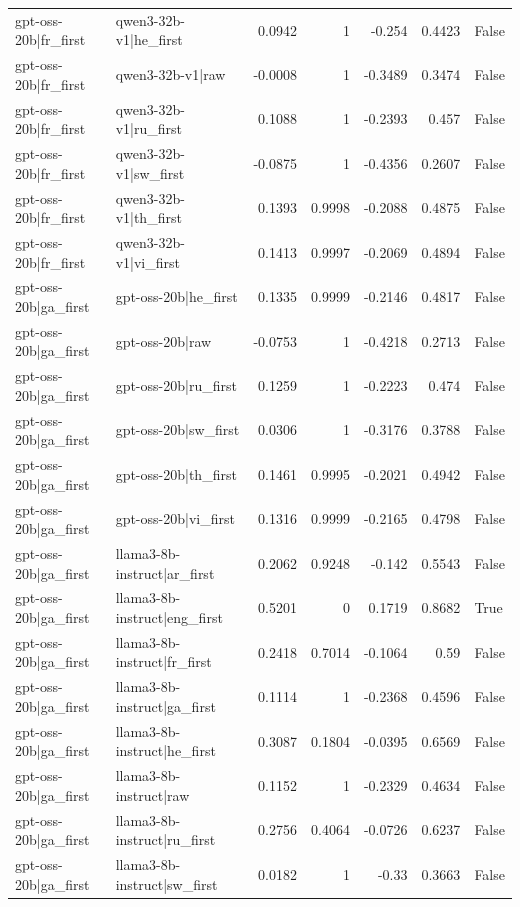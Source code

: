 \begin{table}
\begin{tabular}{l l r r r r l}
gpt-oss-20b|fr_first & qwen3-32b-v1|he_first & 0.0942 & 1 & -0.254 & 0.4423 & False \\
gpt-oss-20b|fr_first & qwen3-32b-v1|raw & -0.0008 & 1 & -0.3489 & 0.3474 & False \\
gpt-oss-20b|fr_first & qwen3-32b-v1|ru_first & 0.1088 & 1 & -0.2393 & 0.457 & False \\
gpt-oss-20b|fr_first & qwen3-32b-v1|sw_first & -0.0875 & 1 & -0.4356 & 0.2607 & False \\
gpt-oss-20b|fr_first & qwen3-32b-v1|th_first & 0.1393 & 0.9998 & -0.2088 & 0.4875 & False \\
gpt-oss-20b|fr_first & qwen3-32b-v1|vi_first & 0.1413 & 0.9997 & -0.2069 & 0.4894 & False \\
gpt-oss-20b|ga_first & gpt-oss-20b|he_first & 0.1335 & 0.9999 & -0.2146 & 0.4817 & False \\
gpt-oss-20b|ga_first & gpt-oss-20b|raw & -0.0753 & 1 & -0.4218 & 0.2713 & False \\
gpt-oss-20b|ga_first & gpt-oss-20b|ru_first & 0.1259 & 1 & -0.2223 & 0.474 & False \\
gpt-oss-20b|ga_first & gpt-oss-20b|sw_first & 0.0306 & 1 & -0.3176 & 0.3788 & False \\
gpt-oss-20b|ga_first & gpt-oss-20b|th_first & 0.1461 & 0.9995 & -0.2021 & 0.4942 & False \\
gpt-oss-20b|ga_first & gpt-oss-20b|vi_first & 0.1316 & 0.9999 & -0.2165 & 0.4798 & False \\
gpt-oss-20b|ga_first & llama3-8b-instruct|ar_first & 0.2062 & 0.9248 & -0.142 & 0.5543 & False \\
gpt-oss-20b|ga_first & llama3-8b-instruct|eng_first & 0.5201 & 0 & 0.1719 & 0.8682 & True \\
gpt-oss-20b|ga_first & llama3-8b-instruct|fr_first & 0.2418 & 0.7014 & -0.1064 & 0.59 & False \\
gpt-oss-20b|ga_first & llama3-8b-instruct|ga_first & 0.1114 & 1 & -0.2368 & 0.4596 & False \\
gpt-oss-20b|ga_first & llama3-8b-instruct|he_first & 0.3087 & 0.1804 & -0.0395 & 0.6569 & False \\
gpt-oss-20b|ga_first & llama3-8b-instruct|raw & 0.1152 & 1 & -0.2329 & 0.4634 & False \\
gpt-oss-20b|ga_first & llama3-8b-instruct|ru_first & 0.2756 & 0.4064 & -0.0726 & 0.6237 & False \\
gpt-oss-20b|ga_first & llama3-8b-instruct|sw_first & 0.0182 & 1 & -0.33 & 0.3663 & False \\

\end{tabular}
\end{table}

